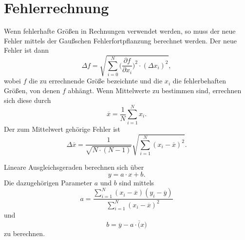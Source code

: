 \section{Fehlerrechnung}
\label{sec:Fehlerrechnung}
Wenn fehlerhafte Größen in Rechnungen verwendet werden, so muss der neue Fehler mittels der Gaußschen Fehlerfortpflanzung berechnet werden. Der neue Fehler ist dann
\begin{equation}
\label{eqt:fehlerfortpflanzung}
\Delta f = \sqrt{\sum_{i=0}^N \bigl( \frac{\partial f}{\partial x_i} \bigr) ^2 \cdot (\Delta x_i)^2 },
\end{equation}
wobei $f$ die zu errechnende Größe bezeichnte und die $x_i$ die fehlerbehaften Größen, von denen $f$ abhängt.
Wenn Mittelwerte zu bestimmen sind, errechnen sich diese durch
\begin{equation}
\label{eqt:mittelwert}
\overline{x} = \frac {1} {N} \sum_{i=1}^N x_i.
\end{equation}
Der zum Mittelwert gehörige Fehler ist
\begin{equation}
\label{eqt:FehlerMittelwert}
\Delta \overline{x} = \frac{1}{\sqrt{N \cdot (N-1)}} \sqrt{ \sum_{i=1}^N (x_i - \overline{x})^2}.
\end{equation}

Lineare Ausgleichsgeraden berechnen sich über
\begin{equation}
\label{eqt:Gerade}
y = a \cdot x + b.
\end{equation}
Die dazugehörigen Parameter $a$ und $b$ sind mittels
\begin{equation}
\label{eqt:a}
a = \frac {\sum_{i=1}^N (x_i - \overline{x}) (y_i - \overline{y})}{\sum_{i=1}^N (x_i - \overline{x})^2}
\end{equation}
und
\begin{equation}
\label{eqt:b}
b = \overline{y} - a \cdot \overline(x)
\end{equation}
zu berechnen.